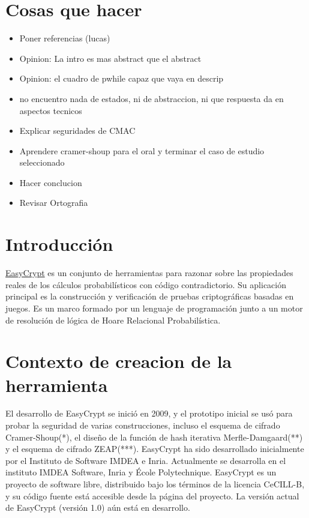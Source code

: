 \documentclass[runningheads,a4paper]{llncs}
\begin{document}
\section{Cosas que hacer}

\begin{itemize}
	\item Poner referencias (lucas)
	\item Opinion: La intro es mas abstract que el abstract
	\item Opinion: el cuadro de pwhile capaz que vaya en descrip
	\item no encuentro nada de estados, ni de abstraccion, ni que respuesta da en aspectos tecnicos
	\item Explicar seguridades de CMAC
	\item Aprendere cramer-shoup para el oral y terminar el caso de estudio seleccionado
	\item Hacer conclucion
	\item Revisar Ortografia
\end{itemize}

\section{Introducción}
\href{https://www.easycrypt.info/trac/}{EasyCrypt} es un conjunto de herramientas para razonar sobre las propiedades reales de los cálculos probabilísticos con código contradictorio. Su aplicación principal es la construcción y verificación de pruebas criptográficas basadas en juegos. 
Es un marco formado por un lenguaje de programación junto a un motor de resolución de lógica de Hoare Relacional Probabilística. 



\section{Contexto de creacion de la herramienta}
El desarrollo de EasyCrypt se inició en 2009, y el prototipo inicial se usó para probar la seguridad de varias construcciones, incluso el esquema de cifrado Cramer-Shoup(*), el diseño de la función de hash iterativa Merfle-Damgaard(**) y el esquema de cifrado ZEAP(***). EasyCrypt ha sido desarrollado inicialmente por el Instituto de Software IMDEA e Inria. Actualmente se desarrolla en el instituto IMDEA Software, Inria y École Polytechnique. EasyCrypt es un proyecto de software libre, distribuido bajo los términos de la licencia CeCILL-B, y su código fuente está accesible desde la página del proyecto. 
La versión actual de EasyCrypt (versión 1.0) aún está en desarrollo. 
\end{document}
